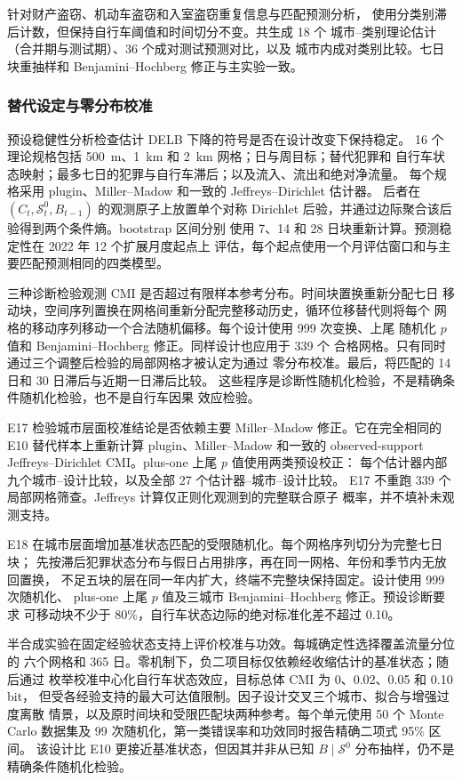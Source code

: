 针对财产盗窃、机动车盗窃和入室盗窃重复信息与匹配预测分析，
使用分类别滞后计数，但保持自行车阈值和时间切分不变。共生成 18 个
城市--类别理论估计（合并期与测试期）、36 个成对测试预测对比，以及
城市内成对类别比较。七日块重抽样和 Benjamini--Hochberg 修正与主实验一致。

\subsubsection{替代设定与零分布校准}
\label{subsec:robustness_null_methods}

预设稳健性分析检查估计 DELB 下降的符号是否在设计改变下保持稳定。
16 个理论规格包括 500~m、1~km 和 2~km 网格；日与周目标；替代犯罪和
自行车状态映射；最多七日的犯罪与自行车滞后；以及流入、流出和绝对净流量。
每个规格采用 plugin、Miller--Madow 和一致的 Jeffreys--Dirichlet 估计器。
后者在 \((C_t,\mathcal S^0_t,B_{t-1})\) 的观测原子上放置单个对称
Dirichlet 后验，并通过边际聚合该后验得到两个条件熵。bootstrap 区间分别
使用 7、14 和 28 日块重新计算。预测稳定性在 2022 年 12 个扩展月度起点上
评估，每个起点使用一个月评估窗口和与主要匹配预测相同的四类模型。

三种诊断检验观测 CMI 是否超过有限样本参考分布。时间块置换重新分配七日
移动块，空间序列置换在网格间重新分配完整移动历史，循环位移替代则将每个
网格的移动序列移动一个合法随机偏移。每个设计使用 999 次变换、上尾
随机化 \(p\) 值和 Benjamini--Hochberg 修正。同样设计也应用于 339 个
合格网格。只有同时通过三个调整后检验的局部网格才被认定为通过
零分布校准。最后，将匹配的 14 日和 30 日滞后与近期一日滞后比较。
这些程序是诊断性随机化检验，不是精确条件随机化检验，也不是自行车因果
效应检验。

E17 检验城市层面校准结论是否依赖主要 Miller--Madow 修正。它在完全相同的
E10 替代样本上重新计算 plugin、Miller--Madow 和一致的 observed-support
Jeffreys--Dirichlet CMI。plus-one 上尾 \(p\) 值使用两类预设校正：
每个估计器内部九个城市--设计比较，以及全部 27 个估计器--城市--设计比较。
E17 不重跑 339 个局部网格筛查。Jeffreys 计算仅正则化观测到的完整联合原子
概率，并不填补未观测支持。

E18 在城市层面增加基准状态匹配的受限随机化。每个网格序列切分为完整七日块；
先按滞后犯罪状态分布与假日占用排序，再在同一网格、年份和季节内无放回置换，
不足五块的层在同一年内扩大，终端不完整块保持固定。设计使用 999 次随机化、
plus-one 上尾 \(p\) 值及三城市 Benjamini--Hochberg 修正。预设诊断要求
可移动块不少于 80\%，自行车状态边际的绝对标准化差不超过 0.10。

半合成实验在固定经验状态支持上评价校准与功效。每城确定性选择覆盖流量分位的
六个网格和 365 日。零机制下，负二项目标仅依赖经收缩估计的基准状态；随后通过
枚举校准中心化自行车状态效应，目标总体 CMI 为 0、0.02、0.05 和 0.10 bit，
但受各经验支持的最大可达值限制。因子设计交叉三个城市、拟合与增强过度离散
情景，以及原时间块和受限匹配块两种参考。每个单元使用 50 个 Monte Carlo
数据集及 99 次随机化，第一类错误率和功效同时报告精确二项式 95\% 区间。
该设计比 E10 更接近基准状态，但因其并非从已知
\(B\mid\mathcal S^0\) 分布抽样，仍不是精确条件随机化检验。


